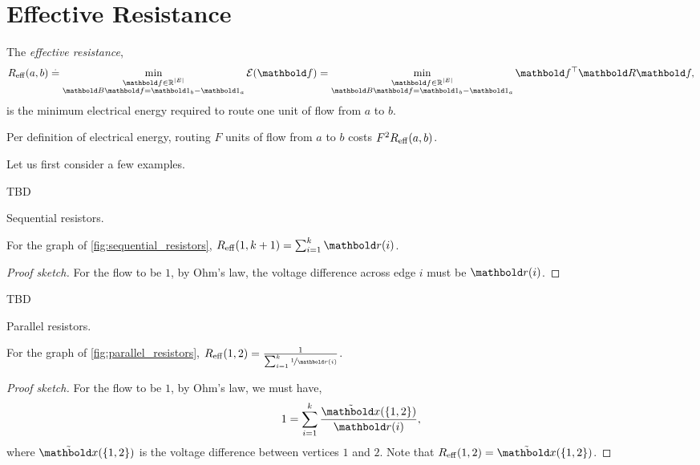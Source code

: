 
\chapter{Effective Resistance}\label{cha:effective_resistance}

\begin{defn} The \emph{effective resistance}, \begin{align}
    \Reff(a,b) \defeq \min_{\substack{\vf \in \R^{|\sE|} \\ \mB\vf = \vOne_b - \vOne_a}} \mathcal{E}(\vf) = \min_{\substack{\vf \in \R^{|\sE|} \\ \mB\vf = \vOne_b - \vOne_a}} \trans{\vf}\mR\vf,
\end{align} is the minimum electrical energy required to route one unit of flow from $a$ to $b$.
\end{defn}
\begin{rmk}
Per definition of electrical energy, routing $F$ units of flow from $a$ to $b$ costs $F^2 R_\mathrm{eff}(a,b)$.
\end{rmk}

Let us first consider a few examples.

\begin{marginfigure}
TBD
\caption{Sequential resistors.}\label{fig:sequential_resistors}
\end{marginfigure}
\begin{ex}
For the graph of \cref{fig:sequential_resistors}, $\Reff(1,k+1) = \sum_{i=1}^k \vr(i)$.
\end{ex}
\begin{proof}[Proof sketch] For the flow to be $1$, by Ohm's law, the voltage difference across edge $i$ must be $\vr(i)$.
\end{proof}

\begin{marginfigure}
TBD
\caption{Parallel resistors.}\label{fig:parallel_resistors}
\end{marginfigure}
\begin{ex}
For the graph of \cref{fig:parallel_resistors}, $\Reff(1,2) = \frac{1}{\sum_{i=1}^k \nicefrac{1}{\vr(i)}}$.
\end{ex}
\begin{proof}[Proof sketch] For the flow to be $1$, by Ohm's law, we must have, \begin{align*}
    1 = \sum_{i=1}^k \frac{\elx(\{1,2\})}{\vr(i)},
\end{align*} where $\elx(\{1,2\})$ is the voltage difference between vertices $1$ and $2$. Note that $\Reff(1,2) = \elx(\{1,2\})$.
\end{proof}

